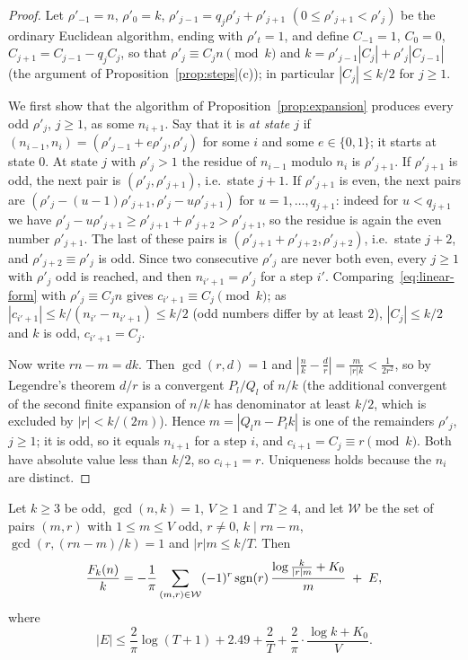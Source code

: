 \begin{proof}
Let $\rho'_{-1}=n$, $\rho'_0=k$, $\rho'_{j-1}=q_j\rho'_j+\rho'_{j+1}$ $(0\le\rho'_{j+1}<\rho'_j)$ be the ordinary Euclidean algorithm, ending with $\rho'_t=1$, and define $C_{-1}=1$, $C_0=0$, $C_{j+1}=C_{j-1}{-}q_jC_j$, so that $\rho'_j\equiv C_jn\pmod k$ and $k=\rho'_{j-1}|C_j|{+}\rho'_j|C_{j-1}|$ (the argument of Proposition~\ref{prop:steps}(c)); in particular $|C_j|\le k/2$ for $j\ge1$.

We first show that the algorithm of Proposition~\ref{prop:expansion} produces every odd $\rho'_j$, $j\ge1$, as some $n_{i+1}$. Say that it is \emph{at state $j$} if $(n_{i-1},n_i)=(\rho'_{j-1}+e\rho'_j,\rho'_j)$ for some $i$ and some $e\in\{0,1\}$; it starts at state $0$. At state $j$ with $\rho'_j>1$ the residue of $n_{i-1}$ modulo $n_i$ is $\rho'_{j+1}$. If $\rho'_{j+1}$ is odd, the next pair is $(\rho'_j,\rho'_{j+1})$, i.e.\ state $j+1$. If $\rho'_{j+1}$ is even, the next pairs are $(\rho'_j-(u-1)\rho'_{j+1},\rho'_j-u\rho'_{j+1})$ for $u=1,\dots,q_{j+1}$: indeed for $u<q_{j+1}$ we have $\rho'_j-u\rho'_{j+1}\ge\rho'_{j+1}+\rho'_{j+2}>\rho'_{j+1}$, so the residue is again the even number $\rho'_{j+1}$. The last of these pairs is $(\rho'_{j+1}+\rho'_{j+2},\rho'_{j+2})$, i.e.\ state $j+2$, and $\rho'_{j+2}\equiv\rho'_j$ is odd. Since two consecutive $\rho'_j$ are never both even, every $j\ge1$ with $\rho'_j$ odd is reached, and then $n_{i'+1}=\rho'_j$ for a step $i'$. Comparing~\eqref{eq:linear-form} with $\rho'_j\equiv C_jn$ gives $c_{i'+1}\equiv C_j\pmod k$; as $|c_{i'+1}|\le k/(n_{i'}-n_{i'+1})\le k/2$ (odd numbers differ by at least $2$), $|C_j|\le k/2$ and $k$ is odd, $c_{i'+1}=C_j$.

Now write $rn-m=dk$. Then $\gcd(r,d)=1$ and $|\frac nk-\frac dr|=\frac m{|r|k}<\frac1{2r^2}$, so by Legendre's theorem $d/r$ is a convergent $P_l/Q_l$ of $n/k$ (the additional convergent of the second finite expansion of $n/k$ has denominator at least $k/2$, which is excluded by $|r|<k/(2m)$). Hence $m=|Q_ln-P_lk|$ is one of the remainders $\rho'_j$, $j\ge1$; it is odd, so it equals $n_{i+1}$ for a step $i$, and $c_{i+1}=C_j\equiv r\pmod k$. Both have absolute value less than $k/2$, so $c_{i+1}=r$. Uniqueness holds because the $n_i$ are distinct.
\end{proof}

\begin{theorem}\label{thm:explicit}
Let $k\ge3$ be odd, $\gcd(n,k)=1$, $V\ge1$ and $T\ge4$, and let $\mathcal W$ be the set of pairs $(m,r)$ with $1\le m\le V$ odd, $r\ne0$, $k\mid rn-m$, $\gcd(r,(rn-m)/k)=1$ and $|r|m\le k/T$. Then
\[
\frac{F_k(n)}k=-\frac1\pi\sum_{(m,r)\in\mathcal W}(-1)^r\operatorname{sgn}(r)\,\frac{\log\frac k{|r|m}+K_0}m\;+\;E,
\]
where
\[
|E|\le\frac2\pi\log(T+1)+2.49+\frac2T+\frac2\pi\cdot\frac{\log k+K_0}V.
\]
\end{theorem}

